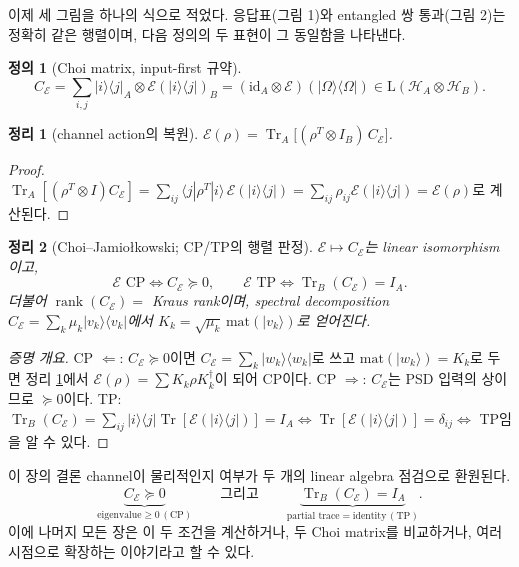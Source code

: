 \documentclass[11pt,a4paper]{article}
\newcommand{\E}{\mathcal{E}}
\newcommand{\Hcal}{\mathcal{H}}
\newcommand{\Tr}{\operatorname{Tr}}
\newcommand{\id}{\mathrm{id}}
\newcommand{\Lin}{\mathrm{L}}
\newcommand{\rank}{\operatorname{rank}}
\theoremstyle{definition}
\newtheorem{definition}{정의}[section]
\theoremstyle{plain}
\newtheorem{theorem}{정리}[section]
\theoremstyle{remark}
\begin{document}
이제 세 그림을 하나의 식으로 적었다. 응답표(그림 1)와 entangled 쌍 통과(그림 2)는 정확히 같은 행렬이며, 다음 정의의 두 표현이 그 동일함을 나타낸다.

\begin{definition}[Choi matrix, input-first 규약]
\[
C_\E=\sum_{i,j}|i\rangle\langle j|_A\otimes\E(|i\rangle\langle j|)_B=(\id_A\otimes\E)(|\Omega\rangle\langle\Omega|)\in\Lin(\Hcal_A\otimes\Hcal_B).
\]
\end{definition}

\begin{theorem}[channel action의 복원]\label{thm:recover}
$\E(\rho)=\Tr_A\big[(\rho^T\otimes I_B)\,C_\E\big]$.
\end{theorem}
\begin{proof}
$\Tr_A[(\rho^T\otimes I)C_\E]=\sum_{ij}\langle j|\rho^T|i\rangle\,\E(|i\rangle\langle j|)=\sum_{ij}\rho_{ij}\E(|i\rangle\langle j|)=\E(\rho)$로 계산된다.
\end{proof}

\begin{theorem}[Choi--Jamio{\l}kowski; CP/TP의 행렬 판정]\label{thm:cj}
$\E\mapsto C_\E$는 linear isomorphism이고,
\[
\boxed{\ \E\text{ CP}\iff C_\E\succeq0,\qquad \E\text{ TP}\iff\Tr_B(C_\E)=I_A.\ }
\]
더불어 $\rank(C_\E)=$ Kraus rank이며, spectral decomposition $C_\E=\sum_k\mu_k|v_k\rangle\langle v_k|$에서 $K_k=\sqrt{\mu_k}\,\mathrm{mat}(|v_k\rangle)$로 얻어진다.
\end{theorem}
\begin{proof}[증명 개요]
CP $\Leftarrow$: $C_\E\succeq0$이면 $C_\E=\sum_k|w_k\rangle\langle w_k|$로 쓰고 $\mathrm{mat}(|w_k\rangle)=K_k$로 두면 정리 \ref{thm:recover}에서 $\E(\rho)=\sum K_k\rho K_k^\dagger$이 되어 CP이다. CP $\Rightarrow$: $C_\E$는 PSD 입력의 상이므로 $\succeq0$이다. TP: $\Tr_B(C_\E)=\sum_{ij}|i\rangle\langle j|\Tr[\E(|i\rangle\langle j|)]=I_A\iff\Tr[\E(|i\rangle\langle j|)]=\delta_{ij}\iff$ TP임을 알 수 있다.
\end{proof}

\begin{mathbox}{이 장의 결론}
channel이 물리적인지 여부가 두 개의 linear algebra 점검으로 환원된다.
\[
\underbrace{C_\E\succeq0}_{\text{eigenvalue}\ge0\,(\text{CP})}\qquad\text{그리고}\qquad\underbrace{\Tr_B(C_\E)=I_A}_{\text{partial trace}=\text{identity}\,(\text{TP})}.
\]
이에 나머지 모든 장은 이 두 조건을 계산하거나, 두 Choi matrix를 비교하거나, 여러 시점으로 확장하는 이야기라고 할 수 있다.
\end{mathbox}
\end{document}
